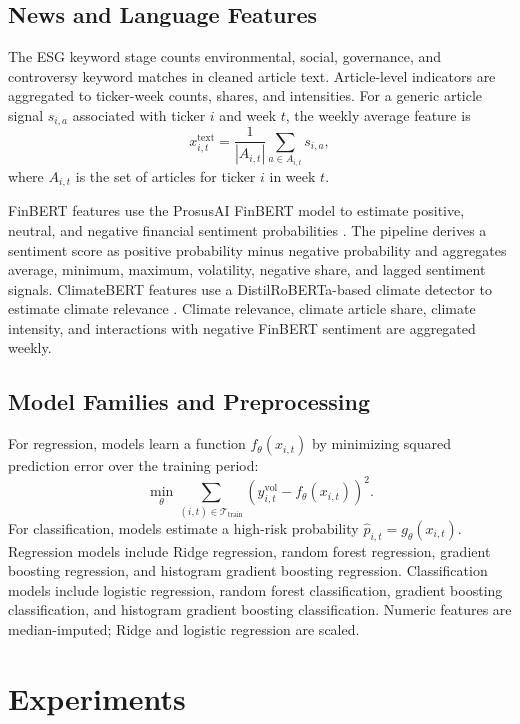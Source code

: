 \documentclass[sigconf,nonacm]{acmart}
\begin{document}
\subsection{News and Language Features}
The ESG keyword stage counts environmental, social, governance, and controversy keyword matches in cleaned article text. Article-level indicators are aggregated to ticker-week counts, shares, and intensities. For a generic article signal $s_{i,a}$ associated with ticker $i$ and week $t$, the weekly average feature is
\begin{equation}
  x_{i,t}^{\mathrm{text}} =
  \frac{1}{|A_{i,t}|}\sum_{a \in A_{i,t}} s_{i,a},
  \label{eq:aggregation}
\end{equation}
where $A_{i,t}$ is the set of articles for ticker $i$ in week $t$.

FinBERT features use the ProsusAI FinBERT model to estimate positive, neutral, and negative financial sentiment probabilities \cite{araci2019finbert}. The pipeline derives a sentiment score as positive probability minus negative probability and aggregates average, minimum, maximum, volatility, negative share, and lagged sentiment signals. ClimateBERT features use a DistilRoBERTa-based climate detector to estimate climate relevance \cite{webersinke2022climatebert}. Climate relevance, climate article share, climate intensity, and interactions with negative FinBERT sentiment are aggregated weekly.

\subsection{Model Families and Preprocessing}
For regression, models learn a function $f_\theta(x_{i,t})$ by minimizing squared prediction error over the training period:
\begin{equation}
  \min_{\theta} \sum_{(i,t)\in \mathcal{T}_{\mathrm{train}}}
  \left(y_{i,t}^{\mathrm{vol}} - f_\theta(x_{i,t})\right)^2.
  \label{eq:objective}
\end{equation}
For classification, models estimate a high-risk probability $\hat{p}_{i,t}=g_\theta(x_{i,t})$. Regression models include Ridge regression, random forest regression, gradient boosting regression, and histogram gradient boosting regression. Classification models include logistic regression, random forest classification, gradient boosting classification, and histogram gradient boosting classification. Numeric features are median-imputed; Ridge and logistic regression are scaled.

\section{Experiments}
\end{document}
